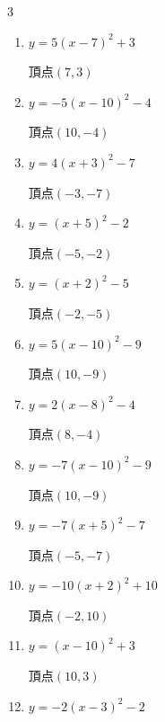 \begin{multicols}{3}
\begin{enumerate}
  \item $\displaystyle y=5\left( x-7\right)^{2}+3$

        $\displaystyle 頂点\left( 7 , 3 \right)$

  \item $\displaystyle y=-5\left( x-10\right)^{2}-4$

        $\displaystyle 頂点\left( 10 , -4 \right)$

\columnbreak %

\resetques

  \item $\displaystyle y=4\left( x+3\right)^{2}-7$

        $\displaystyle 頂点\left( -3 , -7 \right)$

  \item $\displaystyle y=\left( x+5\right)^{2}-2$

        $\displaystyle 頂点\left( -5 , -2 \right)$

  \item $\displaystyle y=\left( x+2\right)^{2}-5$

        $\displaystyle 頂点\left( -2 , -5 \right)$

  \item $\displaystyle y=5\left( x-10\right)^{2}-9$

        $\displaystyle 頂点\left( 10 , -9 \right)$

  \item $\displaystyle y=2\left( x-8\right)^{2}-4$

        $\displaystyle 頂点\left( 8 , -4 \right)$

  \item $\displaystyle y=-7\left( x-10\right)^{2}-9$

        $\displaystyle 頂点\left( 10 , -9 \right)$

  \item $\displaystyle y=-7\left( x+5\right)^{2}-7$

        $\displaystyle 頂点\left( -5 , -7 \right)$

  \item $\displaystyle y=-10\left( x+2\right)^{2}+10$

        $\displaystyle 頂点\left( -2 , 10 \right)$

  \item $\displaystyle y=\left( x-10\right)^{2}+3$

        $\displaystyle 頂点\left( 10 , 3 \right)$

  \item $\displaystyle y=-2\left( x-3\right)^{2}-2$


\end{enumerate}
\end{multicols}
